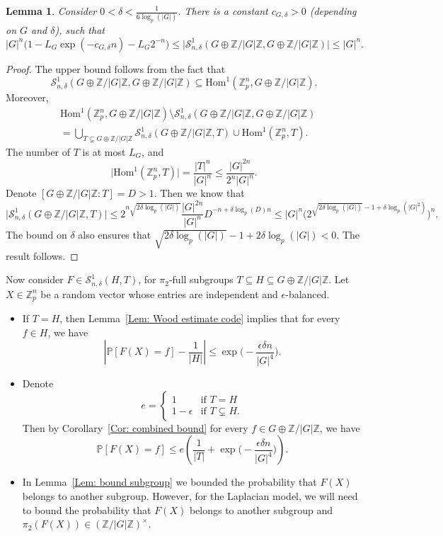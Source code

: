 \documentclass[12pt]{amsart}
\newtheorem{lemma}[theorem]{Lemma}
\theoremstyle{definition}
\newcommand{\PPP}{\mathbb{P}}
\newcommand{\SSO}[3]{\mathcal{S}^1_{#1}(#2,#3)}
\newcommand{\ZG}{\Z/\abs{G}\Z}
\newcommand{\abs}[1]{\vert#1\vert}
\newcommand{\Zp}{\Z_p}
\newcommand{\Z}{\mathbb{Z}}
\newcommand{\Hom}{\text{Hom}}
\begin{document}
\begin{lemma}\label{Lem: count codes H^1}
Consider $0<\delta<\frac{1}{6\log_p(\abs{G})}$.
There is a constant $c_{G,\delta}>0$ (depending on $G$ and $\delta$), such that
\[
\abs{G}^n \Big(1- L_G \exp(-c_{G,\delta}n) - L_G 2^{-n}\Big)
\leq \abs{\SSO{n,\delta}{G\oplus\ZG}{G\oplus\ZG}}
\leq \abs{G}^n.
\]
\end{lemma}
\begin{proof}
The upper bound follows from the fact that
\[
\SSO{n,\delta}{G\oplus\ZG}{G\oplus\ZG} \subseteq \Hom^1(\Zp^n, G\oplus\ZG).
\]
Moreover,
\begin{align*}
&\Hom^1(\Zp^n, G\oplus\ZG) \setminus \SSO{n,\delta}{G\oplus\ZG}{G\oplus\ZG}\\
&=\bigcup_{T\subsetneq G\oplus\ZG} \SSO{n,\delta}{G\oplus\ZG}{T} \cup \Hom^1(\Zp^n,T).
\end{align*}
The number of $T$ is at most $L_G$, and 
\[
\abs{\Hom^1(\Zp^n,T)}
= \frac{\abs{T}^n}{\abs{G}^n} \leq \frac{\abs{G}^{2n}}{2^n\abs{G}^n}.
\]
Denote $[G\oplus\ZG:T]=D>1$. Then we know that
\[
\abs{\SSO{n,\delta}{G\oplus\ZG}{T}}
\leq 2^{n\sqrt{2\delta\log_p(\abs{G})}}
\frac{\abs{G}^{2n}}{\abs{G}^n} D^{-n+\delta\log_p(D)n}
\leq 
\abs{G}^n \Big(2^{\sqrt{2\delta\log_p(\abs{G})}-1+\delta\log_p(\abs{G}^2)}\Big)^n.
\]
The bound on $\delta$ also ensures that $\sqrt{2\delta\log_p(\abs{G})}-1+2\delta\log_p(\abs{G})<0$. The result follows.
\end{proof}


Now consider $F\in\SSO{n,\delta}{H}{T}$, for $\pi_2$-full subgroups $T\subseteq H\subseteq G\oplus\ZG$. Let $X\in\Zp^n$ be a random vector whose entries are independent and $\epsilon$-balanced.
\begin{itemize}
    \item If $T=H$, then Lemma~\ref{Lem: Wood estimate code} implies that for every $f\in H$, we have
    \[
    \left| \PPP[F(X)=f]-\frac{1}{\abs{H}}\right|
    \leq \exp\Big(-\frac{\epsilon \delta n}{|G|^4}\Big).
    \]
    \item Denote
    \[
    e=\begin{cases}
    1&\text{if } T=H\\
    1-\epsilon &\text{if }T\subsetneq H.
    \end{cases}
    \]
    Then by Corollary~\ref{Cor: combined bound} for every $f\in G\oplus\ZG$, we have
    \[
    \PPP[F(X)=f]
    \leq e 
     \left(\frac{1}{\abs{T}}+\exp\Big(-\frac{\epsilon\delta n}{|G|^4}\Big) \right).
    \]
    \item In Lemma~\ref{Lem: bound subgroup} we bounded the probability that $F(X)$ belongs to another subgroup.
    However, for the Laplacian model, we will need to bound the probability that $F(X)$ belongs to another subgroup and $\pi_2(F(X))\in (\ZG)^{\times}$.
\end{itemize}
\end{document}
